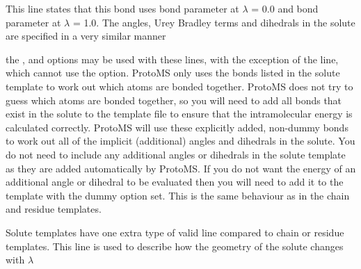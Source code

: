 \documentclass[letterpaper,10pt,english]{sphinxmanual}
\begin{document}
This line states that this bond uses bond parameter  at \(\lambda\) = 0.0 and bond parameter  at \(\lambda\) = 1.0. The angles, Urey Bradley terms and dihedrals in the solute are specified in a very similar manner

%
\begin{sphinxVerbatim}[commandchars=\\\{\}]
      

      

        
\end{sphinxVerbatim}

the ,  and  options may be used with these lines, with the exception of the  line, which cannot use the  option. ProtoMS only uses the bonds listed in the solute template to work out which atoms are bonded together. ProtoMS does not try to guess which atoms are bonded together, so you will need to add all bonds that exist in the solute to the template file to ensure that the intramolecular energy is calculated correctly. ProtoMS will use these explicitly added, non-dummy bonds to work out all of the implicit (additional) angles and dihedrals in the solute. You do not need to include any additional angles or dihedrals in the solute template as they are added automatically by ProtoMS. If you do not want the energy of an additional angle or dihedral to be evaluated then you will need to add it to the template with the dummy option set. This is the same behaviour as in the chain and
residue templates.

Solute templates have one extra type of valid line compared to chain or residue templates. This line is used to describe how the geometry of the solute changes with \(\lambda\)

%
\begin{sphinxVerbatim}[commandchars=\\\{\}]
     
\end{sphinxVerbatim}
\end{document}
